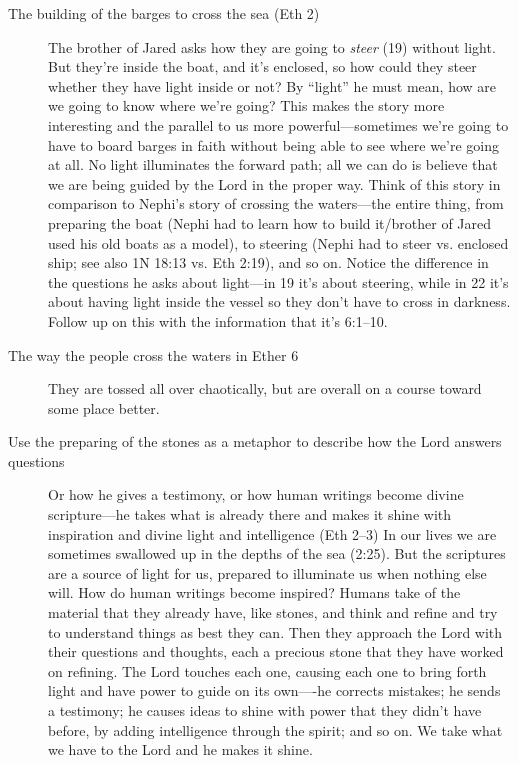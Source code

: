 \begin{description}
		\item[The building of the barges to cross the sea (Eth 2)]
			The brother of Jared asks how they are going to \textit{steer} (19) without light. But they're inside the boat, and it's enclosed, so how could they steer whether they have light inside or not? By ``light'' he must mean, how are we going to know where we're going? This makes the story more interesting and the parallel to us more powerful---sometimes we're going to have to board barges in faith without being able to see where we're going at all. No light illuminates the forward path; all we can do is believe that we are being guided by the Lord in the proper way.
			Think of this story in comparison to Nephi's story of crossing the waters---the entire thing, from preparing the boat (Nephi had to learn how to build it/brother of Jared used his old boats as a model), to steering (Nephi had to steer vs. enclosed ship; see also 1N 18:13 vs. Eth 2:19), and so on.
			Notice the difference in the questions he asks about light---in 19 it's about steering, while in 22 it's about having light inside the vessel so they don't have to cross in darkness.
			Follow up on this with the information that it's 6:1--10.
			
		\item[The way the people cross the waters in Ether 6]
			They are tossed all over chaotically, but are overall on a course toward some place better.
			
		\item[Use the preparing of the stones as a metaphor to describe how the Lord answers questions]
			Or how he gives a testimony, or how human writings become divine scripture---he takes what is already there and makes it shine with inspiration and divine light and intelligence (Eth 2--3)
			In our lives we are sometimes swallowed up in the depths of the sea (2:25). But the scriptures are a source of light for us, prepared to illuminate us when nothing else will. How do human writings become inspired? Humans take of the material that they already have, like stones, and think and refine and try to understand things as best they can. Then they approach the Lord with their questions and thoughts, each a precious stone that they have worked on refining. The Lord touches each one, causing each one to bring forth light and have power to guide on its own----he corrects mistakes; he sends a testimony; he causes ideas to shine with power that they didn't have before, by adding intelligence through the spirit; and so on. We take what we have to the Lord and he makes it shine.
			

\end{description}

